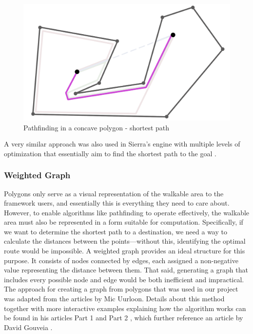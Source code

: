 \begin{figure}[H]
\centering
\includegraphics[width=.7\linewidth]{img/polygon-prototyp2.png}
\caption{Pathfinding in a concave polygon - shortest path}
\label{fig:Path-P2}
\end{figure}

A very similar approach was also used in Sierra's engine with multiple levels of optimization that essentially aim to find the shortest path to the goal \cite{ScummVM-patent}.



\subsubsection{Weighted Graph}
Polygons only serve as a visual representation of the walkable area to the framework users, and essentially this is everything they need to care about. However, to enable algorithms like pathfinding to operate effectively, the walkable area must also be represented in a form suitable for computation. Specifically, if we want to determine the shortest path to a destination, we need a way to calculate the distances between the points—without this, identifying the optimal route would be impossible. A weighted graph provides an ideal structure for this purpose. It consists of nodes connected by edges, each assigned a non-negative value representing the distance between them. That said, generating a graph that includes every possible node and edge would be both inefficient and impractical. The approach for creating a graph from polygons that was used in our project was adapted from the articles by Mic Uurloon. Details about this method together with more interactive examples explaining how the algorithm works can be found in his articles Part 1 \cite{Uurloon1} and Part 2 \cite{Uurloon2}, which further reference an article by David Gouveia \cite{Gouveia}.

